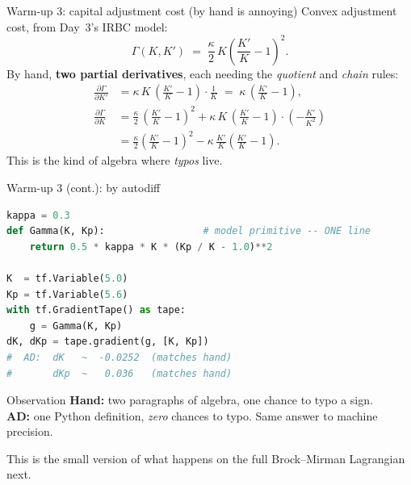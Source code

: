 \documentclass[aspectratio=169,11pt]{beamer}
\newcommand{\emphc}[1]{\textcolor{harvardcrimson}{#1}}
\begin{document}
\begin{frame}[fragile]{Warm-up 3: capital adjustment cost (by hand is annoying)}
\small Convex adjustment cost, from Day~3's IRBC model:
\[
\Gamma(K, K') \;=\; \frac{\kappa}{2}\, K \left(\frac{K'}{K} - 1\right)^2.
\]
By hand, \textbf{two partial derivatives}, each needing the \emph{quotient} and \emph{chain} rules:
\begin{align*}
\tfrac{\partial \Gamma}{\partial K'} &= \kappa\,K\,\left(\tfrac{K'}{K}-1\right)\cdot \tfrac{1}{K} \;=\; \kappa\,\left(\tfrac{K'}{K}-1\right),\\
\tfrac{\partial \Gamma}{\partial K} &= \tfrac{\kappa}{2}\,\left(\tfrac{K'}{K}-1\right)^2
 + \kappa\,K\,\left(\tfrac{K'}{K}-1\right)\cdot\left(-\tfrac{K'}{K^2}\right)\\
 &= \tfrac{\kappa}{2}\left(\tfrac{K'}{K}-1\right)^2 - \kappa\,\tfrac{K'}{K}\left(\tfrac{K'}{K}-1\right).
\end{align*}
This is the kind of algebra where \emph{typos} live.
\end{frame}

\begin{frame}[fragile]{Warm-up 3 (cont.): by autodiff}
\small
\begin{lstlisting}[language=Python,basicstyle=\ttfamily\scriptsize]
kappa = 0.3
def Gamma(K, Kp):                 # model primitive -- ONE line
    return 0.5 * kappa * K * (Kp / K - 1.0)**2

K  = tf.Variable(5.0)
Kp = tf.Variable(5.6)
with tf.GradientTape() as tape:
    g = Gamma(K, Kp)
dK, dKp = tape.gradient(g, [K, Kp])
#  AD:  dK   ~  -0.0252  (matches hand)
#       dKp  ~   0.036   (matches hand)
\end{lstlisting}
\vspace{-2pt}
\begin{block}{Observation}
\small
\textbf{Hand:} two paragraphs of algebra, one chance to typo a sign. \\
\textbf{AD:} one Python definition, \emph{zero} chances to typo. Same answer to machine precision.
\end{block}
\centerline{\emphc{This is the small version of what happens on the full Brock--Mirman Lagrangian next.}}
\end{frame}
\end{document}
